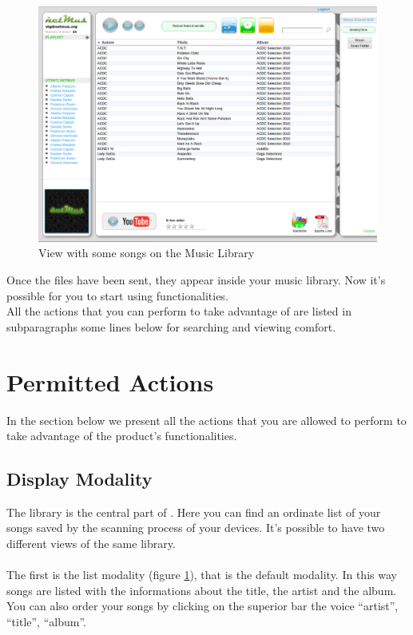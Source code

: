 \begin{figure}[!htbp]
  \centering
  \includegraphics[width=15cm]{img/MU/song_loaded.png}
\caption{View with some songs on the Music Library}
\label{fig:fineUpload}
\end{figure}

Once the files have been sent, they appear inside your music library.
Now it's possible for you to start using  functionalities.\\

All the actions that you can perform to take advantage of  are listed
in subparagraphs some lines below for searching and viewing comfort.

\newpage
\section{Permitted Actions}
In the section below we present all the actions that you are allowed to perform
to take advantage of the product's functionalities.

\subsection{Display Modality}

The library is the central part of . Here you can find an ordinate
list of your songs saved by the scanning process of your devices. It's possible
to have two different views of the same library.\\
\\
The first is the list modality (figure \ref{fig:fineUpload}), that is the
default modality. In this way songs are listed with the informations about the title, the artist and the
album. You can also order your songs by clicking on the superior bar the voice
``artist'', ``title'', ``album''.\\

